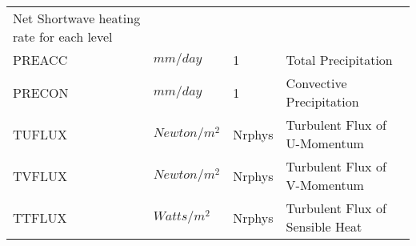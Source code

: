 \begin{tabular}{llll}
\begin{minipage}[t]{3in}
      {Net Shortwave heating rate for each level}
     \end{minipage}\\
 PREACC   &  $mm/day$ &  1
     &\begin{minipage}[t]{3in}
      {Total Precipitation}
     \end{minipage}\\
 PRECON   &  $mm/day$ &  1
     &\begin{minipage}[t]{3in}
      {Convective Precipitation}
     \end{minipage}\\
 TUFLUX   &  $Newton/m^2$ &  Nrphys
     &\begin{minipage}[t]{3in}
      {Turbulent Flux of U-Momentum}
     \end{minipage}\\
 TVFLUX   &  $Newton/m^2$ &  Nrphys
     &\begin{minipage}[t]{3in}
      {Turbulent Flux of V-Momentum}
     \end{minipage}\\
 TTFLUX   &  $Watts/m^2$ &  Nrphys
     &\begin{minipage}[t]{3in}
      {Turbulent Flux of Sensible Heat}
     \end{minipage}\\
\end{tabular}

